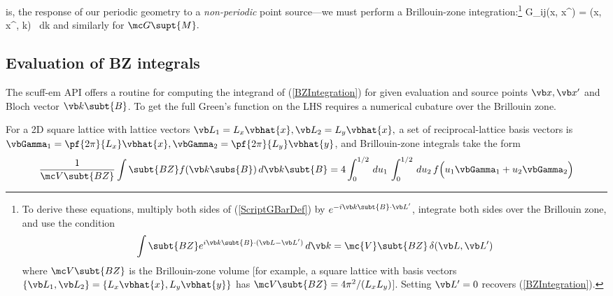 \documentclass[letterpaper]{article}
\begin{document}
is, the response of our periodic geometry to a \textit{non-periodic}
point source---we must perform a Brillouin-zone 
integration:\footnote{To derive these equations, multiply both sides
of (\ref{ScriptGBarDef}) by $e^{-i\vb k\subt{B} \cdot \vb L^\prime}$,
integrate both sides over the Brillouin zone, and use the
condition 
$$\int\subt{BZ} e^{i\vb k\subt{B}\cdot (\vb L-\vb L^\prime)}\,d\vb k
  =\mc{V}\subt{BZ} \, \delta(\vb L,\vb L^\prime)
$$
where $\mc V\subt{BZ}$ is the Brillouin-zone volume [for example,
a square lattice with basis vectors
$\{\vb L_1, \vb L_2\}=\{L_x\vbhat{x}, L_y\vbhat{y}\}$ has
$\mc V\subt{BZ}=4\pi^2/(L_x L_y)$].
Setting $\vb L^\prime=0$ recovers (\ref{BZIntegration}).}
{
  \mc G_{ij}(\vb x, \vb x^\prime)
 = 
   \int{} 
   (\vb x, \vb x^\prime, \vb k)
   \, d\vb k
}
and similarly for $\mc G\supt{M}.$

\subsection*{Evaluation of BZ integrals}

The {\sc scuff-em} API offers a routine for computing the integrand of
(\ref{BZIntegration}) for given evaluation and source points
$\vb x, \vb x^\prime$ and Bloch vector $\vb k\subt{B}$. To get the 
full Green's function on the LHS requires a numerical cubature
over the Brillouin zone.

For a 2D square lattice with lattice vectors 
$\vb L_1=L_x\vbhat{x}, \vb L_2=L_y\vbhat{x},$
a set of reciprocal-lattice basis vectors is 
$\vbGamma_1=\pf{2\pi}{L_x} \vbhat{x},
 \vbGamma_2=\pf{2\pi}{L_y} \vbhat{y}$,
and Brillouin-zone integrals take the form
$$ \frac{1}{\mc V\subt{BZ}} 
   \int\subt{BZ} f(\vb k\subs{B}) \, d \vb k\subt{B}
  =4\int_0^{1/2} \, d u_1 \, \int_0^{1/2} \, d u_2 \, 
   f\Big( u_1\vbGamma_1 + u_2\vbGamma_2 \Big)
$$

\newpage
\end{document}
